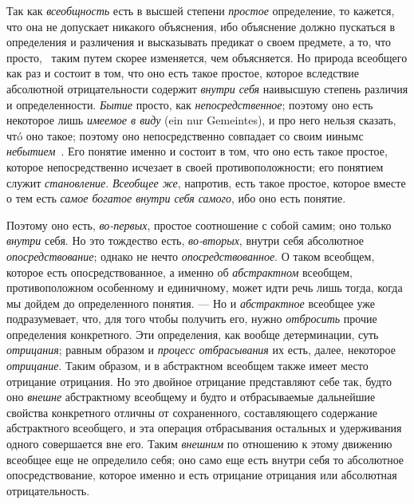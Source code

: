 \documentclass[twoside]{article}
\begin{document}
{{Так как {\em всеобщность}
есть в высшей степени
{\em простое}
определение, то кажется, что она не допускает никакого
объяснения, ибо объяснение должно пускаться в определения и различения и
высказывать предикат о своем предмете, а то, что просто,
\ таким путем скорее изменяется, чем объясняется. Но природа
всеобщего как раз и состоит в том, что оно есть такое простое, которое
вследствие абсолютной отрицательности содержит
{\em внутри себя}
наивысшую степень различия и определенности.
{\em Бытие} просто, как
{\em непосредственное};
поэтому оно есть некоторое лишь
{\em имеемое в виду} (ein nur
Gemeintes), и про него нельзя сказать, чтó оно такое; поэтому
оно непосредственно совпадает со своим иинымс
{\em небытием}~\label{bkm:bm14}.
Его понятие именно и состоит в том, что оно есть такое
простое, которое непосредственно исчезает в своей
противоположности; его понятием служит
{\em становление}.
{\em Всеобщее же},
напротив, есть такое простое, которое вместе о тем есть
{\em самое богатое внутри себя самого},
ибо оно есть понятие.

Поэтому оно есть,
{\em во-первых}, простое
соотношение с собой самим; оно только
{\em внутри} себя. Но это
тождество есть, {\em во-вторых},
внутри себя абсолютное
{\em опосредствование};
однако не нечто
{\em опосредствованное}.
О таком всеобщем, которое есть опосредствованное, а именно об
{\em абстрактном}
всеобщем, противоположном особенному и единичному, может идти
речь лишь тогда, когда мы дойдем до определенного понятия. —
Но и {\em абстрактное}
всеобщее уже подразумевает, что, для того чтобы получить его,
нужно {\em отбросить}
прочие определения конкретного. Эти определения, как вообще
детерминации, суть {\em отрицания};
равным образом и
{\em процесс отбрасывания}
их есть, далее, некоторое
{\em отрицание}. Таким
образом, и в абстрактном всеобщем также имеет место отрицание отрицания. Но
это двойное отрицание представляют себе так, будто оно
{\em внешне} абстрактному
всеобщему и будто и отбрасываемые дальнейшие свойства конкретного отличны
от сохраненного, составляющего содержание абстрактного всеобщего, и эта
операция отбрасывания остальных и удерживания одного совершается вне его.
Таким {\em внешним} по
отношению к этому движению всеобщее еще не определило себя; оно само еще
есть внутри себя то абсолютное опосредствование, которое именно и есть
отрицание отрицания или абсолютная отрицательность.

}}
\end{document}
